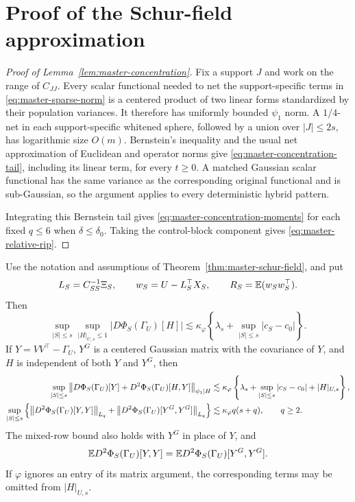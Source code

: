 \section{Proof of the Schur-field approximation}\label{app:schur-proof}

\begin{proof}[Proof of Lemma~\ref{lem:master-concentration}]
Fix a support $J$ and work on the range of $C_{JJ}$.  Every scalar
functional needed to net the support-specific terms in
\eqref{eq:master-sparse-norm} is a centered product of two linear forms
standardized by their population variances.  It therefore has uniformly
bounded $\psi_1$ norm.  A $1/4$-net in each support-specific whitened
sphere, followed by a union over $|J|\le2s$, has logarithmic size
$O(m)$.  Bernstein's inequality and the usual net approximation of
Euclidean and operator norms give \eqref{eq:master-concentration-tail},
including its linear term, for every $t\ge0$.  A matched Gaussian scalar functional
has the same variance as the corresponding original functional and is
sub-Gaussian, so the argument applies to every deterministic hybrid
pattern.

Integrating this Bernstein tail gives
\eqref{eq:master-concentration-moments} for each fixed $q\le6$ when
$\delta\le\delta_0$.  Taking the control-block component gives
\eqref{eq:master-relative-rip}.
\end{proof}
\begin{lemma}
\label{lem:residual-field-row-bounds}
Use the notation and assumptions of
Theorem~\ref{thm:master-schur-field}, and put
\[
 L_S=C_{SS}^{-1}\Xi_S,\qquad
 w_S=U-L_S^\top X_S,\qquad
 R_S=\mathbb E(w_Sw_S^\top).
\]
Then
\begin{equation}\label{eq:residual-field-derivative-bound}
 \sup_{|S|\le s}\sup_{|H|_{U,s}\le1}
 |D\Phi_S(\Gamma_U)[H]|
 \lesssim\kappa_\varphi
 \left\{\lambda_s+\sup_{|S|\le s}|c_S-c_0|\right\}.
\end{equation}
If $Y=VV^\top-\Gamma_U$, $Y^G$ is a centered Gaussian matrix with the
covariance of $Y$, and $H$ is independent of both $Y$ and $Y^G$, then
\begin{align}
 \sup_{|S|\le s}
 \left\lVert D\Phi_S(\Gamma_U)[Y]+D^2\Phi_S(\Gamma_U)[H,Y]\right\rVert_{\psi_1\mid H}
 &\lesssim\kappa_\varphi\left\{
 \lambda_s+\sup_{|S|\le s}|c_S-c_0|+|H|_{U,s}\right\},
 \label{eq:residual-field-mixed-row-bound}\\
 \sup_{|S|\le s}\left\{
 \left\lVert D^2\Phi_S(\Gamma_U)[Y,Y]\right\rVert_{L_q}
 +\left\lVert D^2\Phi_S(\Gamma_U)[Y^G,Y^G]\right\rVert_{L_q}\right\}
 &\lesssim\kappa_\varphi q(s+q),\qquad q\ge2.
 \label{eq:residual-field-diagonal-bound}
\end{align}
The mixed-row bound also holds with $Y^G$ in place of $Y$, and
\begin{equation}\label{eq:residual-field-diagonal-mean}
 \mathbb E D^2\Phi_S(\Gamma_U)[Y,Y]
 =\mathbb E D^2\Phi_S(\Gamma_U)[Y^G,Y^G].
\end{equation}
If $\varphi$ ignores an entry of its matrix argument, the corresponding
terms may be omitted from $|H|_{U,s}$.
\end{lemma}

